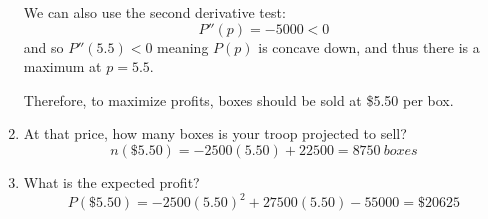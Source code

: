 \documentclass[letterpaper,12pt,fleqn]{article}
\begin{document}
\begin{enumerate}
  We can also use the second derivative test:
  \[P''(p)=-5000<0\]
  and so \(P''(5.5)<0\) meaning \(P(p)\) is concave down, and thus there is a maximum at \(p=5.5\).

  Therefore, to maximize profits, boxes should be sold at \$5.50 per box.

\item At that price, how many boxes is your troop projected to sell?
  \[n(\$5.50)=-2500(5.50)+22500=\SI{8750}{boxes}\]

\item What is the expected profit?
  \[P(\$5.50)=-2500(5.50)^2+27500(5.50)-55000=\$20625\]

\end{enumerate}
\end{document}
